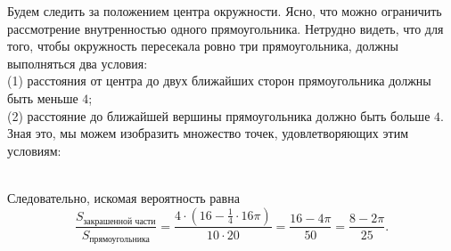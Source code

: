 \documentclass{article}
\begin{document}
Будем следить за положением центра окружности. Ясно, что можно ограничить рассмотрение внутренностью одного прямоугольника. Нетрудно видеть, что для того, чтобы окружность пересекала ровно три прямоугольника, должны выполняться два условия:\\
(1) расстояния от центра до двух ближайших сторон прямоугольника должны быть меньше $4$;\\
(2) расстояние до ближайшей вершины прямоугольника должно быть больше $4$.\\
Зная это, мы можем изобразить множество точек, удовлетворяющих этим условиям:
\begin{figure}[!h]
\end{figure}
\\Следовательно, искомая вероятность равна
$$\frac{S_{\text{закрашенной части}}}{S_{\text{прямоугольника}}} = \frac{4 \cdot (16 - \frac14 \cdot 16\pi)}{10 \cdot 20} = \frac{16 - 4\pi}{50} = \frac{8 - 2\pi}{25}.$$
\end{document}
